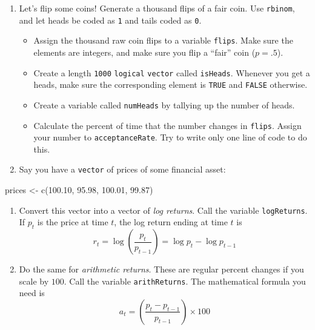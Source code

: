 \documentclass[
  12pt,
]{krantz}
\makeatletter
\newenvironment{Shaded}{\begin{snugshade}}{\end{snugshade}}
\newcommand{\FloatTok}[1]{\textcolor[rgb]{0.06,0.06,0.06}{#1}}
\newcommand{\FunctionTok}[1]{\textcolor[rgb]{0,0,0}{#1}}
\newcommand{\NormalTok}[1]{#1}
\newcommand{\OtherTok}[1]{\textcolor[rgb]{0.37,0.37,0.37}{#1}}
\providecommand{\tightlist}{%
  \setlength{\itemsep}{0pt}\setlength{\parskip}{0pt}}
\newenvironment{kframe}{%
\medskip{}
\setlength{\fboxsep}{.8em}
 \def\at@end@of@kframe{}%
 \ifinner\ifhmode%
  \def\at@end@of@kframe{\end{minipage}}%
  \begin{minipage}{\columnwidth}%
 \fi\fi%
 \def\FrameCommand##1{\hskip\@totalleftmargin \hskip-\fboxsep
 \colorbox{shadecolor}{##1}\hskip-\fboxsep
     \hskip-\linewidth \hskip-\@totalleftmargin \hskip\columnwidth}%
 \MakeFramed {\advance\hsize-\width
   \@totalleftmargin\z@ \linewidth\hsize
   \@setminipage}}%
 {\par\unskip\endMakeFramed%
 \at@end@of@kframe}
\renewenvironment{Shaded}{\begin{kframe}}{\end{kframe}}
\makeatother
\begin{document}
\begin{enumerate}
\def\labelenumi{\arabic{enumi}.}
\item
  Let's flip some coins! Generate a thousand flips of a fair coin. Use \texttt{rbinom}, and let heads be coded as \texttt{1} and tails coded as \texttt{0}.

  \begin{itemize}
  \tightlist
  \item
    Assign the thousand raw coin flips to a variable \texttt{flips}. Make sure the elements are integers, and make sure you flip a ``fair'' coin (\(p=.5\)).
  \item
    Create a length \texttt{1000} \texttt{logical} \texttt{vector} called \texttt{isHeads}. Whenever you get a heads, make sure the corresponding element is \texttt{TRUE} and \texttt{FALSE} otherwise.
  \item
    Create a variable called \texttt{numHeads} by tallying up the number of heads.
  \item
    Calculate the percent of time that the number changes in \texttt{flips}. Assign your number to \texttt{acceptanceRate}. Try to write only one line of code to do this.
  \end{itemize}
\item
  Say you have a \texttt{vector} of prices of some financial asset:
\end{enumerate}

\begin{Shaded}
\begin{Highlighting}[]
\NormalTok{prices }\OtherTok{\textless{}{-}} \FunctionTok{c}\NormalTok{(}\FloatTok{100.10}\NormalTok{, }\FloatTok{95.98}\NormalTok{, }\FloatTok{100.01}\NormalTok{, }\FloatTok{99.87}\NormalTok{)}
\end{Highlighting}
\end{Shaded}

\begin{enumerate}
\def\labelenumi{\alph{enumi}.}
\item
  Convert this vector into a vector of \emph{log returns}. Call the variable \texttt{logReturns}. If \(p_t\) is the price at time \(t\), the log return ending at time \(t\) is
  \[ r_t = \log \left( \frac{p_t}{p_{t-1}} \right) = \log p_t - \log p_{t-1}\]
\item
  Do the same for \emph{arithmetic returns}. These are regular percent changes if you scale by \(100\). Call the variable \texttt{arithReturns}. The mathematical formula you need is \[ a_t = \left( \frac{p_t - p_{t-1} }{p_{t-1}} \right) \times 100 \]
\end{enumerate}
\end{document}
